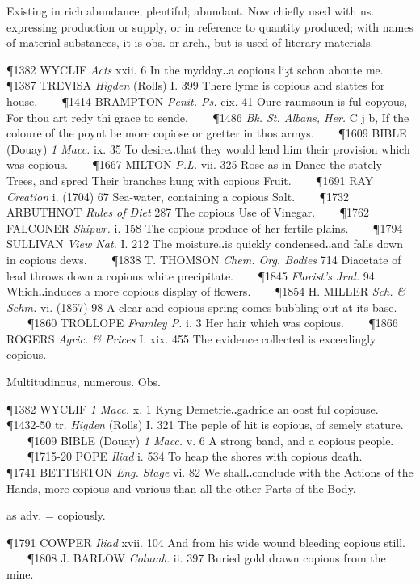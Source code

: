 \begin{description}[wide, labelwidth=!, labelindent=0pt]
\begin{myenumerate}
 Existing in rich abundance; plentiful; abundant. Now chiefly used with ns. expressing production or supply, or in reference to quantity produced; with names of material substances, it is obs. or arch., but is used of literary materials.

\P 1382 WYCLIF  \textit{Acts} xxii. 6 In the mydday‥a copious liȝt schon aboute me.    
\P 1387 TREVISA  \textit{Higden} (Rolls) I. 399 There lyme is copious and slattes for house.    
\P 1414 BRAMPTON  \textit{Penit. Ps.} cix. 41 Oure raumsoun is ful copyous, For thou art redy thi grace to sende.    
\P 1486  \textit{Bk. St. Albans, Her.} C j b, If the coloure of the poynt be more copiose or gretter in thos armys.    
\P 1609 BIBLE  (Douay) \textit{1 Macc.} ix. 35 To desire‥that they would lend him their provision which was copious.    
\P 1667 MILTON  \textit{P.L.} vii. 325 Rose as in Dance the stately Trees, and spred Their branches hung with copious Fruit.    
\P 1691 RAY  \textit{Creation} i. (1704) 67 Sea-water, containing a copious Salt.    
\P 1732 ARBUTHNOT  \textit{Rules of Diet} 287 The copious Use of Vinegar.    
\P 1762 FALCONER  \textit{Shipwr.} i. 158 The copious produce of her fertile plains.    
\P 1794 SULLIVAN  \textit{View Nat.} I. 212 The moisture‥is quickly condensed‥and falls down in copious dews.    
\P 1838 T. THOMSON  \textit{Chem. Org. Bodies} 714 Diacetate of lead throws down a copious white precipitate.    
\P 1845  \textit{Florist's Jrnl.} 94 Which‥induces a more copious display of flowers.    
\P 1854 H. MILLER  \textit{Sch. \& Schm.} vi. (1857) 98 A clear and copious spring comes bubbling out at its base.    
\P 1860 TROLLOPE  \textit{Framley P.} i. 3 Her hair which was copious.    
\P 1866 ROGERS  \textit{Agric. \& Prices} I. xix. 455 The evidence collected is exceedingly copious.

 Multitudinous, numerous. Obs.

\P 1382 WYCLIF  \textit{1 Macc.} x. 1 Kyng Demetrie‥gadride an oost ful copiouse.    
\P 1432-50 tr.  \textit{Higden} (Rolls) I. 321 The peple of hit is copious, of semely stature.    
\P 1609 BIBLE  (Douay) \textit{1 Macc.} v. 6 A strong band, and a copious people.    
\P 1715-20 POPE  \textit{Iliad} i. 534 To heap the shores with copious death.    
\P 1741 BETTERTON  \textit{Eng. Stage} vi. 82 We shall‥conclude with the Actions of the Hands, more copious and various than all the other Parts of the Body.

 as adv. = copiously.

\P 1791 COWPER  \textit{Iliad} xvii. 104 And from his wide wound bleeding copious still.    
\P 1808 J. BARLOW  \textit{Columb.} ii. 397 Buried gold drawn copious from the mine.
\end{myenumerate}



\end{description}
